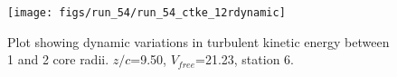 \begin{figure}[H]
\centering
\texttt{[image: figs/run\_54/run\_54\_ctke\_12rdynamic]}
\caption{Plot showing dynamic variations in turbulent kinetic energy between 1 and 2 core radii. $z/c$=9.50, $V_{free}$=21.23, station 6.}
\end{figure}


